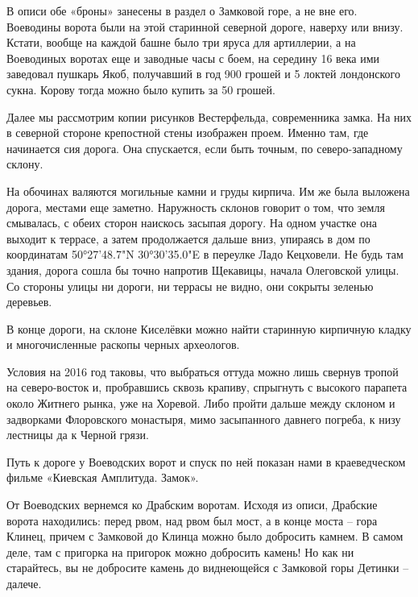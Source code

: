 В описи обе «броны» занесены в раздел о Замковой горе, а не вне его. Воеводины ворота были на этой старинной северной дороге, наверху или внизу. Кстати, вообще на каждой башне было три яруса для артиллерии, а на Воеводиных воротах еще и заводные часы с боем, на середину 16 века ими заведовал пушкарь Якоб, получавший в год 900 грошей и 5 локтей лондонского сукна. Корову тогда можно было купить за 50 грошей.

Далее мы рассмотрим копии рисунков Вестерфельда, современника замка. На них в северной стороне крепостной стены изображен проем. Именно там, где начинается сия дорога. Она спускается, если быть точным, по северо-западному склону.

На обочинах валяются могильные камни и груды кирпича. Им же была выложена дорога, местами еще заметно. Наружность склонов говорит о том, что земля смывалась, с обеих сторон наискось засыпая дорогу. На одном участке она выходит к террасе, а затем продолжается дальше вниз, упираясь в дом по координатам 50°27'48.7"N 30°30'35.0"E в переулке Ладо Кецховели. Не будь там здания, дорога сошла бы точно напротив Щекавицы, начала Олеговской улицы. Со стороны улицы ни дороги, ни террасы не видно, они сокрыты зеленью деревьев.

В конце дороги, на склоне Киселёвки можно найти старинную кирпичную кладку и многочисленные раскопы черных археологов. 

Условия на 2016 год таковы, что выбраться оттуда можно лишь свернув тропой на северо-восток и, пробравшись сквозь крапиву, спрыгнуть с высокого парапета около Житнего рынка, уже на Хоревой. Либо пройти дальше между склоном и задворками Флоровского монастыря, мимо засыпанного давнего погреба, к низу лестницы да к Черной грязи.

Путь к дороге у Воеводских ворот и спуск по ней показан нами в краеведческом фильме «Киевская Амплитуда. Замок».


От Воеводских вернемся ко Драбским воротам. Исходя из описи, Драбские ворота находились: перед рвом, над рвом был мост, а в конце моста – гора Клинец, причем с Замковой до Клинца можно было добросить камнем. В самом деле, там с пригорка на пригорок можно добросить камень! Но как ни старайтесь, вы не добросите камень до виднеющейся с Замковой горы Детинки – далече.

